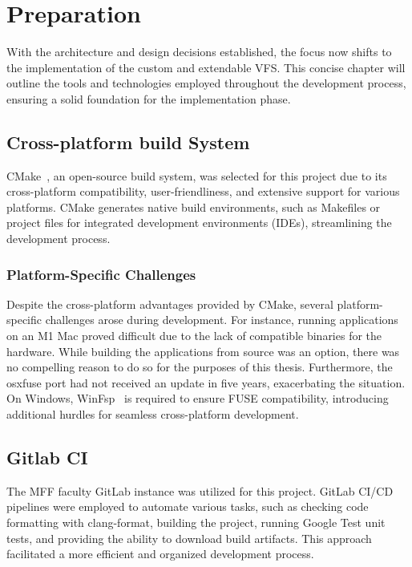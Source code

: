 \chapter{Preparation}
\label{chap:preparation}

With the architecture and design decisions established, the focus now shifts to the implementation of the custom and extendable VFS\@.
This concise chapter will outline the tools and technologies employed throughout the development process, ensuring a solid foundation for the implementation phase.


\section{Cross-platform build System}\label{sec:build-system-and-cross-platform-challenges}

CMake~\cite{cmake}, an open-source build system, was selected for this project due to its cross-platform compatibility, user-friendliness, and extensive support for various platforms.
CMake generates native build environments, such as Makefiles or project files for integrated development environments (IDEs), streamlining the development process.

\subsection{Platform-Specific Challenges}\label{subsec:platform-specific-challenges}

Despite the cross-platform advantages provided by CMake, several platform-specific challenges arose during development.
For instance, running applications on an M1 Mac proved difficult due to the lack of compatible binaries for the hardware.
While building the applications from source was an option, there was no compelling reason to do so for the purposes of this thesis.
Furthermore, the osxfuse port had not received an update in five years, exacerbating the situation.
On Windows, WinFsp~\cite{winfsp} is required to ensure FUSE compatibility, introducing additional hurdles for seamless cross-platform development.


\section{Gitlab CI}\label{sec:gitlab-ci}

The MFF faculty GitLab instance was utilized for this project\cite{gitlab_mff}.
GitLab CI/CD pipelines were employed to automate various tasks, such as checking code formatting with clang-format, building the project, running Google Test unit tests, and providing the ability to download build artifacts.
This approach facilitated a more efficient and organized development process.

